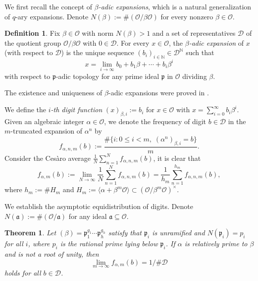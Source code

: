 \documentclass[12pt]{amsart}
\theoremstyle{plain}
\newtheorem{thm}{Theorem}[section]
\theoremstyle{definition}
\newtheorem{defn}{Definition}[section]
\theoremstyle{remark}
\numberwithin{equation}{section}
\newcommand{\N}{\mathbb N}
\begin{document}
	We first recall the concept of \emph{$\beta$-adic expansions}, which is a natural generalization of $q$-ary expansions. Denote $N(\beta):=\#(\mathcal{O}/\beta\mathcal{O})$ for every  nonzero $\beta\in \mathcal O$.  
	\begin{defn}
		Fix $\beta\in \mathcal O$ with norm $N(\beta)>1$ and a set of representatives $\mathcal D$ of the quotient group $\mathcal{O} / \beta \mathcal{O}$ with $0\in\mathcal D$. For every $x \in \mathcal{O}$, the \emph{$\beta$-adic expansion} of $x$ (with respect to $\mathcal D$) is the unique sequence $(b_i)_{i\in\N} \in \mathcal D^{\N}$ such that 
		\begin{equation}\label{2401171345}
			x=\lim_{i\rightarrow\infty}b_0+b_1\beta+\cdots+b_i\beta^i
		\end{equation}
		with respect to $\mathfrak{p}$-adic topology for any prime ideal $\mathfrak{p}$ in $\mathcal{O}$ dividing $\beta$. 
	\end{defn}
	The existence and uniqueness of $\beta$-adic expansions were proved in \cite[Section 2]{LZ2025}. 
	
	We define the \emph{$i$-th digit function} $(x)_{\beta,i}:=b_i$ for $x\in\mathcal{O}$ with $x=\sum_{i=0}^{\infty}b_i\beta^i$. Given an algebraic integer $\alpha\in\mathcal{O}$, we denote the frequency of digit $b\in\mathcal D$ in the $m$-truncated expansion of $\alpha^n$ by
	\begin{equation}\label{2601061743}
		f_{\alpha,n,m}(b):=\frac{\#\{i\colon 0\le i<m,\;(\alpha^n)_{\beta,i}=b\}}{m}. 
	\end{equation}
	Consider the Ces\`aro average $\frac{1}{N}\sum_{n=1}^{N}f_{\alpha,n,m}(b)$, it is clear that
	\begin{equation}\label{2601061744}
		f_{\alpha,m}(b):=\lim_{N\to\infty}\frac{1}{N}\sum_{n=1}^{N}f_{\alpha,n,m}(b)=\frac{1}{h_m}\sum_{n=1}^{h_m}f_{\alpha,n,m}(b),
	\end{equation}
	where $h_m:=\#H_m$ and $H_m:=\langle\alpha+\beta^m\mathcal{O}\rangle\subset(\mathcal{O}/\beta^m\mathcal{O})^\times$. 
	
	We establish the asymptotic equidistribution of digits. Denote $N(\mathfrak{a}):=\#(\mathcal{O}/\mathfrak{a})$ for any ideal $\mathfrak{a}\subseteq\mathcal{O}$.
	\begin{thm}\label{2505041026}
		Let $(\beta)=\mathfrak{p}_1^{g_1}\cdots\mathfrak{p}_h^{g_h}$ satisfy that $\mathfrak{p}_i$ is unramified and \(N(\mathfrak{p}_i) = p_i\) for all $i$, where $p_i$ is the rational prime lying below $\mathfrak{p}_i$. If $\alpha$ is relatively prime to $\beta$ and is not a root of unity, then
		\begin{equation}\label{2512251734}
			\lim_{m\to\infty}f_{\alpha,m}(b)=1/\#\mathcal{D}
		\end{equation}
		holds for all $b\in\mathcal{D}$.
	\end{thm}
	
\end{document}
